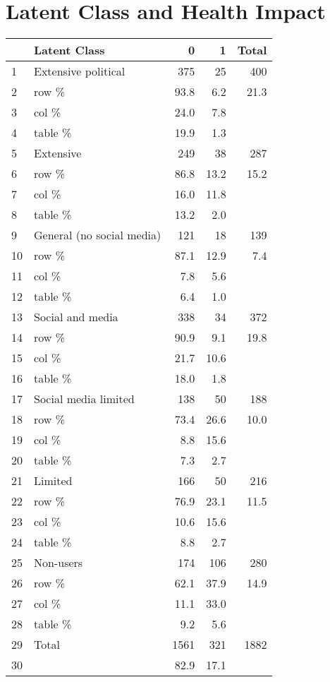 \documentclass{article}
\begin{document}
\section{Latent Class and Health Impact}

\begin{table}[ht]
\centering
\begin{tabular}{llrrr}
  \hline
 & Latent Class & 0 & 1 & Total \\ 
  \hline
1 & Extensive political & 375 & 25 & 400 \\ 
  2 & row \% & 93.8 & 6.2 & 21.3 \\ 
  3 & col \% & 24.0 & 7.8 &  \\ 
  4 & table \% & 19.9 & 1.3 &  \\ 
  5 & Extensive & 249 & 38 & 287 \\ 
  6 & row \% & 86.8 & 13.2 & 15.2 \\ 
  7 & col \% & 16.0 & 11.8 &  \\ 
  8 & table \% & 13.2 & 2.0 &  \\ 
  9 & General (no social media) & 121 & 18 & 139 \\ 
  10 & row \% & 87.1 & 12.9 & 7.4 \\ 
  11 & col \% & 7.8 & 5.6 &  \\ 
  12 & table \% & 6.4 & 1.0 &  \\ 
  13 & Social and media & 338 & 34 & 372 \\ 
  14 & row \% & 90.9 & 9.1 & 19.8 \\ 
  15 & col \% & 21.7 & 10.6 &  \\ 
  16 & table \% & 18.0 & 1.8 &  \\ 
  17 & Social media limited & 138 & 50 & 188 \\ 
  18 & row \% & 73.4 & 26.6 & 10.0 \\ 
  19 & col \% & 8.8 & 15.6 &  \\ 
  20 & table \% & 7.3 & 2.7 &  \\ 
  21 & Limited & 166 & 50 & 216 \\ 
  22 & row \% & 76.9 & 23.1 & 11.5 \\ 
  23 & col \% & 10.6 & 15.6 &  \\ 
  24 & table \% & 8.8 & 2.7 &  \\ 
  25 & Non-users & 174 & 106 & 280 \\ 
  26 & row \% & 62.1 & 37.9 & 14.9 \\ 
  27 & col \% & 11.1 & 33.0 &  \\ 
  28 & table \% & 9.2 & 5.6 &  \\ 
  29 & Total & 1561 & 321 & 1882 \\ 
  30 &  & 82.9 & 17.1 &  \\ 
   \hline
\end{tabular}
\end{table}
\end{document}
